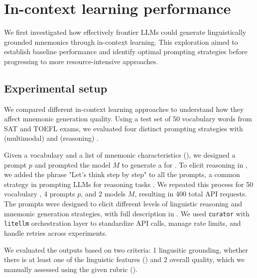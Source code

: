 \section{In-context learning performance} \label{sec:icl-performance}

We first investigated how effectively frontier LLMs could generate linguistically grounded mnemonics through in-context learning. This exploration aimed to establish baseline performance and identify optimal prompting strategies before progressing to more resource-intensive approaches.

\subsection{Experimental setup}
We compared different in-context learning approaches to understand how they affect mnemonic generation quality. Using a test set of 50 vocabulary words from SAT and TOEFL exams, we evaluated four distinct prompting strategies with \xteachermodel (multimodal) and \teachermodel (reasoning) \citep{DeepSeek-AIDEEPSEEKR12025,DeepSeekV32025}.

Given a vocabulary \vocab and a list of mnemonic characteristics (), we designed a prompt $p$ and prompted the model $M$ to generate a \lgm \mnem for \vocab. To elicit reasoning in \xteachermodel, we added the phrase "Let's think step by step" to all the prompts, a common strategy in prompting LLMs for reasoning tasks \citep{weiChainofThoughtPromptingElicits2022}. We repeated this process for 50 vocabulary \vocab, 4 prompts $p$, and 2 models $M$, resulting in 400 total API requests. The prompts were designed to elicit different levels of linguistic reasoning and mnemonic generation strategies, with full description in . We used \verb|curator| \citep{BespokeLabBESPOKE2025} with \verb|litellm| orchestration layer to standardize API calls, manage rate limits, and handle retries across experiments.


We evaluated the outputs based on two criteria: \numlist{1} lingusitic grounding, whether there is at least one of the linguistic features () and \numlist{2} overall quality, which we manually assessed using the given rubric ().

